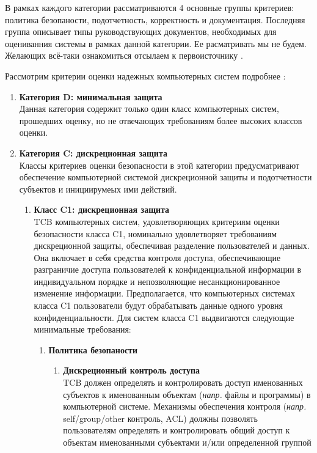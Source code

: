 В рамках каждого категории рассматриваются 4 основные группы критериев: политика безопаности, подотчетность, корректность и документация. Последняя группа описывает типы руководствующих 
документов, необходимых для оцениванния системы в рамках данной категории. Ее расматривать мы не будем. Желающих всё-таки ознакомиться отсылаем к первоисточнику \cite{OrangeBook}.

Рассмотрим критерии оценки надежных компьютерных систем подробнее \cite{OrangeBook}:


\begin{enumerate}
	\item{\textbf{Категория D: минимальная защита}}\\
	Данная категория содержит только один класс компьютерных систем, прошедших оценку, но не отвечающих требованиям более высоких классов оценки.
	\item{\textbf{Категория C: дискреционная защита}}\\
	Классы критериев оценки безопасности в этой категории предусматривают обеспечение компьютерной системой дискреционной защиты и подотчетности субъектов и инициирумеых ими действий.
	\begin{enumerate}
		\item{\textbf{Класс C1: дискреционная защита}}\\
		TCB компьютерных систем, удовлетворяющих критериям оценки безопасности класса C1, номинально удовлетворяет требованиям дискреционной защиты, обеспечивая разделение пользователей и данных.
		Она включает в себя средства контроля доступа, обеспечивающие разграничие доступа пользователей к конфиденциальной информации в индивидуальном порядке и непозволяющие несанкционированное
		изменение информации. Предполагается, что компьютерных системах класса C1 пользователи будут обрабатывать данные одного уровня конфиденциальности. Для систем класса C1 выдвигаются следующие
		минимальные требования:
		\begin{enumerate}
			\item{\textbf{Политика безопаности}}
			\begin{enumerate}
				\item{\textbf{Дискреционный контроль доступа}}\\
				TCB должен определять и контролировать доступ именованных субъектов к именованным объектам (\textit{напр.} файлы и программы) в компьютерной системе. Механизмы обеспечения контроля
				(\textit{напр.} self/group/other контроль, ACL) должны позволять пользователям определять и контролировать общий доступ к объектам именованными субъектами и/или определенной группой

\end{enumerate}
\end{enumerate}
\end{enumerate}
\end{enumerate}
